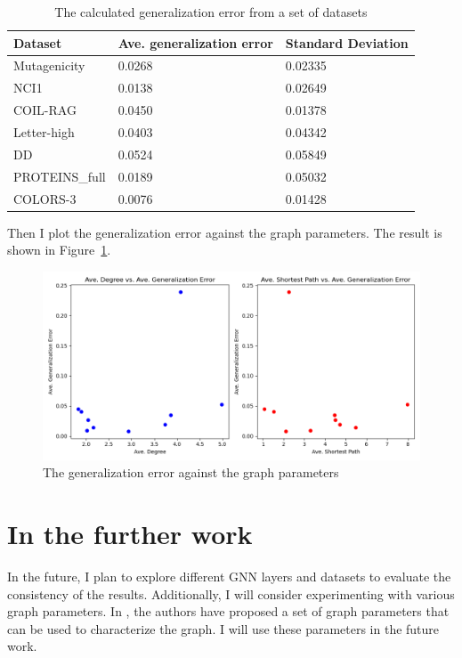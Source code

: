 \documentclass{article}
\begin{document}
\begin{table}[h!]
    \centering
    \begin{tabular}{@{}lll@{}}
    \toprule
    Dataset        & Ave. generalization error & Standard Deviation   \\ \midrule
    Mutagenicity   & 0.0268      & 0.02335 \\
    NCI1           & 0.0138      & 0.02649 \\
    COIL-RAG       & 0.0450      & 0.01378 \\
    Letter-high    & 0.0403      & 0.04342 \\
    DD             & 0.0524      & 0.05849 \\
    PROTEINS\_full & 0.0189      & 0.05032 \\
    COLORS-3       & 0.0076      & 0.01428 \\ \bottomrule
    \end{tabular}
    \caption{The calculated generalization error from a set of datasets}
    \label{tab:error}
\end{table}

Then I plot the generalization error against the graph parameters. The result is shown in Figure~\ref{fig:scatter}.

\begin{figure}[h!]
    \includegraphics[width=\textwidth]{final_results.png}
    \caption{The generalization error against the graph parameters}
    \label{fig:scatter}
\end{figure}

\section{In the further work}
In the future, I plan to explore different GNN layers and datasets to evaluate the consistency of the results. Additionally, I will consider experimenting with various graph parameters. In \cite{gera2018annotated}, the authors have proposed a set of graph parameters that can be used to characterize the graph. I will use these parameters in the future work.
\end{document}
